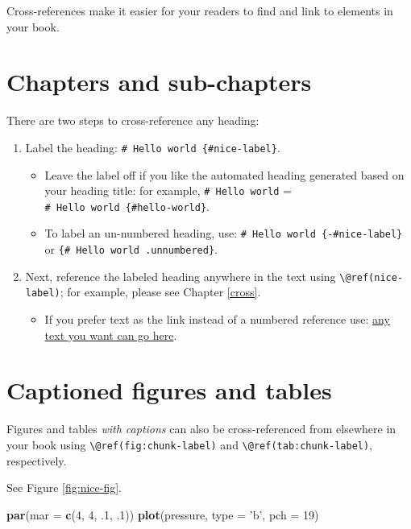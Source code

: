 \documentclass[]{book}
\newenvironment{Shaded}{\begin{snugshade}}{\end{snugshade}}
\newcommand{\KeywordTok}[1]{\textcolor[rgb]{0.13,0.29,0.53}{\textbf{{#1}}}}
\newcommand{\DataTypeTok}[1]{\textcolor[rgb]{0.13,0.29,0.53}{{#1}}}
\newcommand{\DecValTok}[1]{\textcolor[rgb]{0.00,0.00,0.81}{{#1}}}
\newcommand{\StringTok}[1]{\textcolor[rgb]{0.31,0.60,0.02}{{#1}}}
\newcommand{\NormalTok}[1]{{#1}}
\providecommand{\tightlist}{%
  \setlength{\itemsep}{0pt}\setlength{\parskip}{0pt}}
\begin{document}
Cross-references make it easier for your readers to find and link to
elements in your book.

\section{Chapters and sub-chapters}\label{chapters-and-sub-chapters}

There are two steps to cross-reference any heading:

\begin{enumerate}
\def\labelenumi{\arabic{enumi}.}
\tightlist
\item
  Label the heading: \texttt{\#\ Hello\ world\ \{\#nice-label\}}.

  \begin{itemize}
  \tightlist
  \item
    Leave the label off if you like the automated heading generated
    based on your heading title: for example, \texttt{\#\ Hello\ world}
    = \texttt{\#\ Hello\ world\ \{\#hello-world\}}.
  \item
    To label an un-numbered heading, use:
    \texttt{\#\ Hello\ world\ \{-\#nice-label\}} or
    \texttt{\{\#\ Hello\ world\ .unnumbered\}}.
  \end{itemize}
\item
  Next, reference the labeled heading anywhere in the text using
  \texttt{\textbackslash{}@ref(nice-label)}; for example, please see
  Chapter \ref{cross}.

  \begin{itemize}
  \tightlist
  \item
    If you prefer text as the link instead of a numbered reference use:
    \protect\hyperlink{cross}{any text you want can go here}.
  \end{itemize}
\end{enumerate}

\section{Captioned figures and
tables}\label{captioned-figures-and-tables}

Figures and tables \emph{with captions} can also be cross-referenced
from elsewhere in your book using
\texttt{\textbackslash{}@ref(fig:chunk-label)} and
\texttt{\textbackslash{}@ref(tab:chunk-label)}, respectively.

See Figure \ref{fig:nice-fig}.

\begin{Shaded}
\begin{Highlighting}[]
\KeywordTok{par}\NormalTok{(}\DataTypeTok{mar =} \KeywordTok{c}\NormalTok{(}\DecValTok{4}\NormalTok{, }\DecValTok{4}\NormalTok{, .}\DecValTok{1}\NormalTok{, .}\DecValTok{1}\NormalTok{))}
\KeywordTok{plot}\NormalTok{(pressure, }\DataTypeTok{type =} \StringTok{'b'}\NormalTok{, }\DataTypeTok{pch =} \DecValTok{19}\NormalTok{)}
\end{Highlighting}
\end{Shaded}
\end{document}
